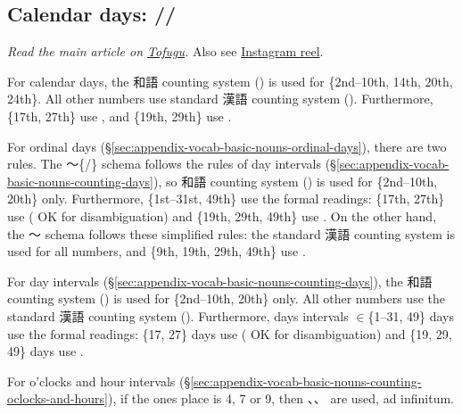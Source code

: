 \documentclass[../nihongo-gakushuu-kyouzai-supplementary.tex]{subfiles}
\begin{document}
\subsection{Calendar days: //} \label{sec:appendix-vocab-basic-nouns-calendar-days}
\emph{Read the main article on \href{https://www.tofugu.com/japanese/japanese-counter-ka-nichi/}{Tofugu}.} Also see \href{https://www.instagram.com/reel/C_4iSZdyIPt/}{Instagram reel}.

\color{orange}
For calendar days, the 和語 counting system () is used for \{2nd--10th, 14th, 20th, 24th\}. All other numbers use standard 漢語 counting system (). Furthermore, \{17th, 27th\} use , and \{19th, 29th\} use .

For ordinal days (\S\ref{sec:appendix-vocab-basic-nouns-ordinal-days}), there are two rules. The 〜\{/\} schema follows the rules of day intervals (\S\ref{sec:appendix-vocab-basic-nouns-counting-days}), so 和語 counting system () is used for \{2nd--10th, 20th\} only. Furthermore, \{1st--31st, 49th\} use the formal readings: \{17th, 27th\} use  ( OK for disambiguation) and \{19th, 29th, 49th\} use . On the other hand, the 〜 schema follows these simplified rules: the standard 漢語 counting system is used for all numbers, and \{9th, 19th, 29th, 49th\} use .

For day intervals (\S\ref{sec:appendix-vocab-basic-nouns-counting-days}), the 和語 counting system () is used for \{2nd--10th, 20th\} only. All other numbers use the standard 漢語 counting system (). Furthermore, days intervals $\in$\{1--31, 49\} days use the formal readings: \{17, 27\} days use  ( OK for disambiguation) and \{19, 29, 49\} days use .

For o'clocks and hour intervals (\S\ref{sec:appendix-vocab-basic-nouns-counting-oclocks-and-hours}), if the ones place is 4, 7 or 9, then 、、 are used, ad infinitum.
\color{black}
\end{document}
